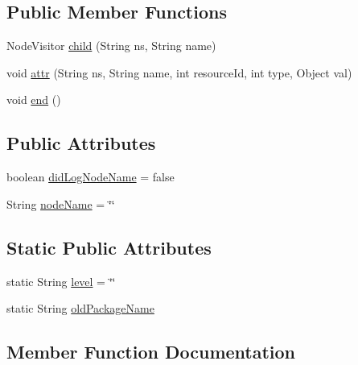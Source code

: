 \subsection*{Public Member Functions}
\begin{DoxyCompactItemize}
\item 
Node\+Visitor \hyperlink{classorg_1_1buildmlearn_1_1toolkit_1_1utilities_1_1SignerThread_1_1MyNodeVisitor_a05f97c2038cc17afc47a3f326fa92e93}{child} (String ns, String name)
\item 
void \hyperlink{classorg_1_1buildmlearn_1_1toolkit_1_1utilities_1_1SignerThread_1_1MyNodeVisitor_a3e1e4a8dcacab23e9aec8de08332aece}{attr} (String ns, String name, int resource\+Id, int type, Object val)
\item 
void \hyperlink{classorg_1_1buildmlearn_1_1toolkit_1_1utilities_1_1SignerThread_1_1MyNodeVisitor_a260e1d884a8485791f30fefe5e471a44}{end} ()
\end{DoxyCompactItemize}
\subsection*{Public Attributes}
\begin{DoxyCompactItemize}
\item 
boolean \hyperlink{classorg_1_1buildmlearn_1_1toolkit_1_1utilities_1_1SignerThread_1_1MyNodeVisitor_a7ee90eb178f04dba7f39105d74fe9e9d}{did\+Log\+Node\+Name} = false
\item 
String \hyperlink{classorg_1_1buildmlearn_1_1toolkit_1_1utilities_1_1SignerThread_1_1MyNodeVisitor_a381105acceb26ff48a41195c7eee0464}{node\+Name} = \char`\"{}\char`\"{}
\end{DoxyCompactItemize}
\subsection*{Static Public Attributes}
\begin{DoxyCompactItemize}
\item 
static String \hyperlink{classorg_1_1buildmlearn_1_1toolkit_1_1utilities_1_1SignerThread_1_1MyNodeVisitor_a9069a03514616d36f34648b515d7cb53}{level} = \char`\"{}\char`\"{}
\item 
static String \hyperlink{classorg_1_1buildmlearn_1_1toolkit_1_1utilities_1_1SignerThread_1_1MyNodeVisitor_a9ed543fd9c4c2364c14288380e0f6ebe}{old\+Package\+Name}
\end{DoxyCompactItemize}


\subsection{Member Function Documentation}
